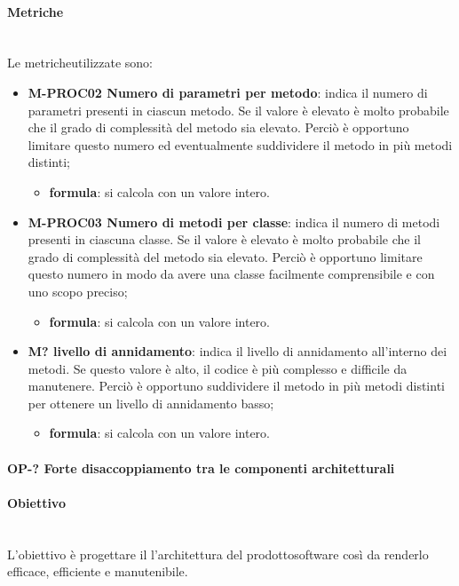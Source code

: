 		\paragraph*{Metriche}\mbox{}\\ [1mm]
		Le metriche\glosp utilizzate sono:
			\begin{itemize}
				\item \textbf{M-PROC02 Numero di parametri per metodo}: indica il numero di parametri presenti in ciascun metodo. Se il valore è elevato è molto probabile che il grado di complessità del metodo sia elevato. Perciò è opportuno limitare questo numero ed eventualmente suddividere il metodo in più metodi distinti;
				\begin{itemize}
					\item[] \textbf{formula}: si calcola con un valore intero.
				\end{itemize}
				\item \textbf{M-PROC03 Numero di metodi per classe}: indica il numero di metodi presenti in ciascuna classe. Se il valore è elevato è molto probabile che il grado di complessità del metodo sia elevato. Perciò è opportuno limitare questo numero in modo da avere una classe facilmente comprensibile e con uno scopo preciso;
				\begin{itemize}
					\item[] \textbf{formula}: si calcola con un valore intero.
				\end{itemize}
				\item \textbf{M? livello di annidamento}: indica il livello di annidamento all'interno dei metodi. Se questo valore è alto, il codice è più complesso e difficile da manutenere. Perciò è opportuno suddividere il metodo in più metodi distinti per ottenere un livello di annidamento basso;
				\begin{itemize}
					\item[] \textbf{formula}: si calcola con un valore intero.
				\end{itemize}
			\end{itemize}
	
		\paragraph{OP-? Forte disaccoppiamento tra le componenti architetturali}
		\paragraph*{Obiettivo}\mbox{}\\ [1mm]
		L'obiettivo è progettare il l'architettura del prodotto\glosp software così da renderlo efficace, efficiente e manutenibile.
